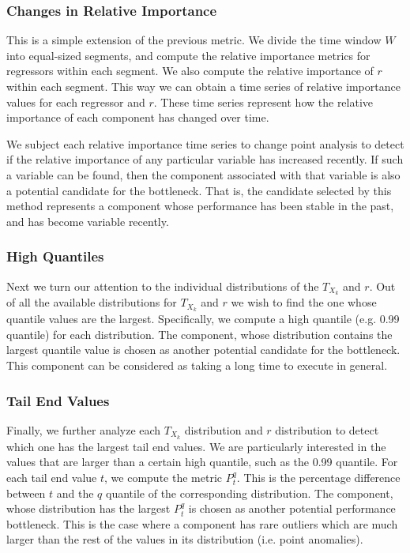 \subsubsection{Changes in Relative Importance}

This is a simple extension of the previous metric. We divide the time window $W$ into equal-sized segments,
and compute the relative importance metrics for regressors within each segment. We also compute the
relative importance of $r$ within each segment. This way we can
obtain a time series of relative importance values for each regressor and $r$. These time series
represent how the relative importance of each component has changed over time.

We subject each relative importance time series to change point analysis to detect if the relative importance of any particular
variable has increased recently. If such a variable can be found, then the component
associated with that variable is also a potential candidate for the bottleneck. 
That is, the candidate selected by this method represents
a component whose performance has been stable in the past, and has become variable recently. 

\subsubsection{High Quantiles}

\label{sec:highquantile}
Next we turn our attention to the individual distributions of the $T_{X_k}$ and $r$. 
Out of all the available distributions for $T_{X_k}$ and $r$
we wish to find the one whose quantile values are the largest.
Specifically, we compute a high
quantile (e.g. 0.99 quantile) for each distribution. The component, whose distribution 
contains the largest quantile value
is chosen as another potential candidate for the bottleneck. This component can be considered
as taking a long time to execute in general.

\subsubsection{Tail End Values}

\label{sec:tailend}
Finally, we further analyze each $T_{X_k}$ distribution and $r$ distribution to detect which one has the largest tail end values.
We are particularly interested in the values that are larger than a certain high quantile, such as the 0.99 quantile.
For each tail end value $t$, we compute the metric $P^q_t$. This is the percentage difference between $t$ and the
$q$ quantile of the corresponding distribution. The component, whose distribution has
the largest $P^q_t$ is chosen as another potential performance bottleneck.
This is the case where a component has rare outliers which are much larger than the rest of 
the values in its distribution (i.e. point anomalies).

